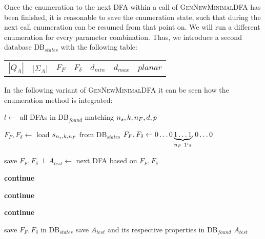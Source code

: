 Once the enumeration to the next DFA within a call of \textsc{GenNewMinimalDFA} has been finished, it is reasonable to save the enumeration state, such that during the next call enumeration can be resumed from that point on. We will run a different enumeration for every parameter combination. Thus, we introduce a second database DB$_{states}$ with the following table:
\begin{center}
	\begin{tabular}{c c c c c c c}
		$|Q_A|$ & |$\Sigma_A$| & $F_F$ & $F_\delta$ & $d_{min}$ & $d_{max}$ & $planar$
	\end{tabular}
\end{center}
In the following variant of \textsc{GenNewMinimalDFA} it can be seen how the enumeration method is integrated:
\vspace{0.2cm}
\begin{algorithmic}[1]
	
		\vspace{0.2cm}
	
		\State $l \gets$ all DFAs in DB$_{found}$ matching ${n_s}, k, {n_F}, d, p$
		
		\vspace{0.2cm}
		
			\State $F_F, F_\delta \gets$ load $s_{{n_s}, k, {n_F}}$ from DB$_{states}$
		\Else
			\State $F_F,F_\delta \gets 0\ldots0\underbrace{1\ldots1}_{{n_F}\ 1's}, 0\ldots0$
		\EndIf
		
		\vspace{-0.2cm}
		\newpage
		
			\vspace{0.2cm}
		
				\State save $F_F, F_\delta$
				\State\Return $\bot$
			\EndIf
			\State $A_{test} \gets$ next DFA based on $F_F, F_\delta$
			
			\vspace{0.2cm}
			
				\State \textbf{continue}
			\EndIf
			
				\State \textbf{continue}
			\EndIf
			
				\State \textbf{continue}
			\EndIf
			
			\vspace{0.2cm}
			
			\State save $F_F, F_\delta$ in DB$_{states}$
			\State save $A_{test}$ and its respective properties in DB$_{found}$
			\State\Return $A_{test}$
		\EndWhile
	\EndFunction
\end{algorithmic}
\vspace{0.2cm}

